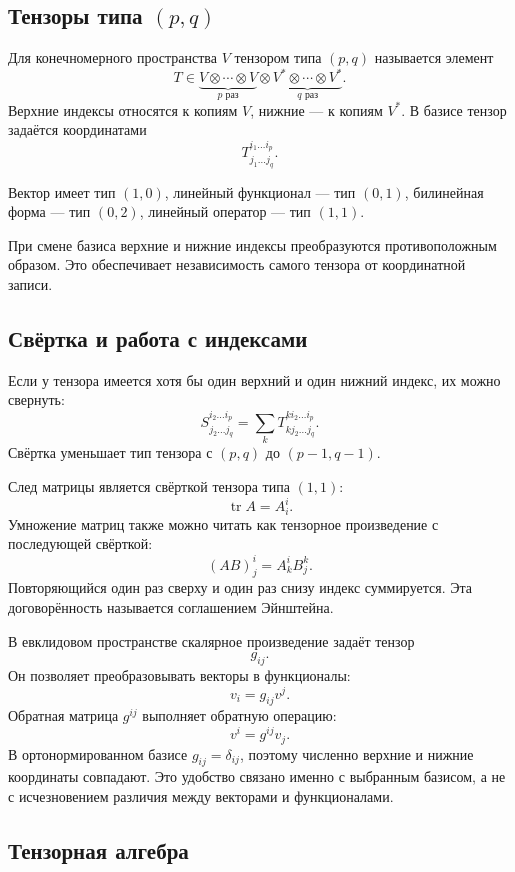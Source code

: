 \subsection{Тензоры типа \texorpdfstring{\((p,q)\)}{(p,q)}}

Для конечномерного пространства \(V\) тензором типа \((p,q)\) называется элемент
\[
T\in
\underbrace{V\otimes\cdots\otimes V}_{p\text{ раз}}
\otimes
\underbrace{V^*\otimes\cdots\otimes V^*}_{q\text{ раз}}.
\]
Верхние индексы относятся к копиям \(V\), нижние --- к копиям \(V^*\). В базисе тензор задаётся координатами
\[
T^{i_1\dots i_p}_{j_1\dots j_q}.
\]

Вектор имеет тип \((1,0)\), линейный функционал --- тип \((0,1)\), билинейная форма --- тип \((0,2)\), линейный оператор --- тип \((1,1)\).

При смене базиса верхние и нижние индексы преобразуются противоположным образом. Это обеспечивает независимость самого тензора от координатной записи.

\subsection{Свёртка и работа с индексами}

Если у тензора имеется хотя бы один верхний и один нижний индекс, их можно свернуть:
\[
S^{i_2\dots i_p}_{j_2\dots j_q}
=
\sum_k
T^{k i_2\dots i_p}_{k j_2\dots j_q}.
\]
Свёртка уменьшает тип тензора с \((p,q)\) до \((p-1,q-1)\).

След матрицы является свёрткой тензора типа \((1,1)\):
\[
\operatorname{tr}A=A^i_i.
\]
Умножение матриц также можно читать как тензорное произведение с последующей свёрткой:
\[
(AB)^i_j
=
A^i_kB^k_j.
\]
Повторяющийся один раз сверху и один раз снизу индекс суммируется. Эта договорённость называется соглашением Эйнштейна.

В евклидовом пространстве скалярное произведение задаёт тензор
\[
g_{ij}.
\]
Он позволяет преобразовывать векторы в функционалы:
\[
v_i=g_{ij}v^j.
\]
Обратная матрица \(g^{ij}\) выполняет обратную операцию:
\[
v^i=g^{ij}v_j.
\]
В ортонормированном базисе \(g_{ij}=\delta_{ij}\), поэтому численно верхние и нижние координаты совпадают. Это удобство связано именно с выбранным базисом, а не с исчезновением различия между векторами и функционалами.

\subsection{Тензорная алгебра}

